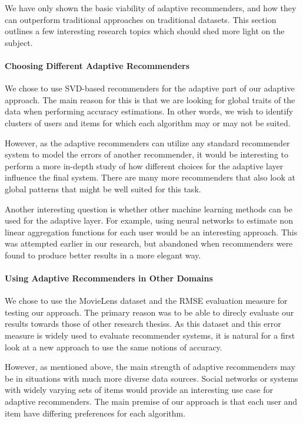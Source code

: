 We have only shown the basic viability of adaptive recommenders,
and how they can outperform traditional approaches on traditional datasets.
This section outlines a few interesting research topics
which should shed more light on the subject.


\paragraph{Choosing Different Adaptive Recommenders}
We chose to use SVD-based recommenders for the adaptive part of our adaptive approach.
The main reason for this is that we are looking for global traits of the data
when performing accuracy estimations. In other words, we wish to identify
clusters of users and items for which each algorithm may or may not be suited.

However, as the adaptive recommenders can utilize any standard recommender system
to model the errors of another recommender, it would be interesting to perform
a more in-depth study of how different choices for the adaptive layer
influence the final system.
There are many more recommenders that also look at global patterns
that might be well suited for this task.

Another interesting question is whether other machine learning methods can be used for the adaptive layer.
For example, using neural networks to estimate non linear aggregation functions for each user would be an interesting approach.
This was attempted earlier in our research, but abandoned when recommenders were found to produce
better results in a more elegant way.


\paragraph{Using Adaptive Recommenders in Other Domains}
We chose to use the MovieLens dataset and the RMSE evaluation measure for testing our approach.
The primary reason was to be able to direcly evaluate our results towards those of other research thesiss.
As this dataset and this error measure is widely used to evaluate recommender systems,
it is natural for a first look at a new approach to use the same notions of accuracy.

However, as mentioned above, the main strength of adaptive recommenders may be
in situations with much more diverse data sources. Social networks or systems
with widely varying sets of items would provide an interesting use case for adaptive recommenders.
The main premise of our approach is that each user and item have differing preferences
for each algorithm. 

